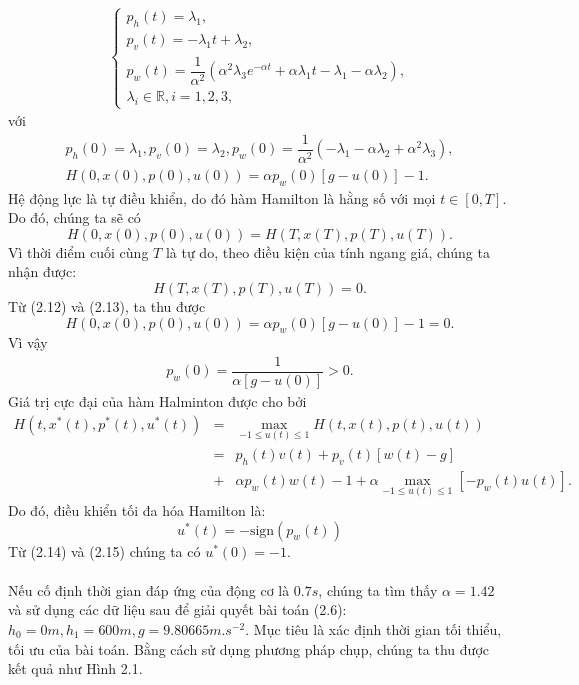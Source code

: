 \documentclass[12pt,a4paper]{report}
\begin{document}
	\begin{eqnarray}
		\begin{cases}
			p_h(t) = \lambda_1, \\ p_v(t) = -\lambda_1t + \lambda_2, \\ p_w(t) = \dfrac{1}{\alpha^2}(\alpha^2\lambda_3e^{-\alpha t} + \alpha\lambda_1t - \lambda_1 - \alpha\lambda_2), \\ \lambda_i \in \mathbb{R}, i = 1,2,3,
		\end{cases}
	\end{eqnarray} với \begin{eqnarray}
	p_h(0) = \lambda_1, p_v(0) = \lambda_2, p_w(0) = \dfrac{1}{\alpha^2}(-\lambda_1-\alpha\lambda_2 + \alpha^2\lambda_3), \\ H(0, x(0), p(0), u(0)) = \alpha p_w(0)[g - u(0)] - 1.
\end{eqnarray} Hệ động lực là tự điều khiển, do đó hàm Hamilton là hằng số với mọi $t \in [0, T]$. Do đó, chúng ta sẽ có \begin{equation}
H(0, x(0), p(0), u(0)) = H(T, x(T), p(T), u(T)).
\end{equation} Vì thời điểm cuối cùng $T$ là tự do, theo điều kiện của tính ngang giá, chúng ta nhận được: \begin{equation}
H(T, x(T), p(T), u(T)) = 0.
\end{equation}
Từ (2.12) và (2.13), ta thu được $$H(0, x(0), p(0), u(0)) = \alpha p_w(0)[g-u(0)] - 1 = 0.$$ Vì vậy \begin{eqnarray}
	p_w(0) = \dfrac{1}{\alpha[g-u(0)]} > 0.
\end{eqnarray}
Giá trị cực đại của hàm Halminton được cho bởi \begin{eqnarray}
	H(t, x^*(t), p^*(t), u^*(t)) &=& \max_{-1 \leq u(t) \leq 1}H(t, x(t), p(t), u(t)) \nonumber\\ &=&p_h(t)v(t) + p_v(t)[w(t)-g] \nonumber\\&+& \alpha p_w(t)w(t) - 1 + \alpha \max_{-1 \leq u(t) \leq 1}[-p_w(t)u(t)]. \nonumber
\end{eqnarray} Do đó, điều khiển tối đa hóa Hamilton là: \begin{equation}
u^*(t) = -\text{sign}(p_w(t))
\end{equation}
Từ (2.14) và (2.15) chúng ta có $u^*(0) = -1.$ \\\\Nếu cố định thời gian đáp ứng của động cơ là $0.7s$, chúng ta tìm thấy $\alpha = 1.42$ và sử dụng các dữ liệu sau để giải quyết bài toán (2.6): $h_0=0m, h_1 = 600m, g = 9.80665m.s^{-2}$. Mục tiêu là xác định thời gian tối thiểu, tối ưu của bài toán. Bằng cách sử dụng phương pháp chụp, chúng ta thu được kết quả như Hình 2.1.
\end{document}

